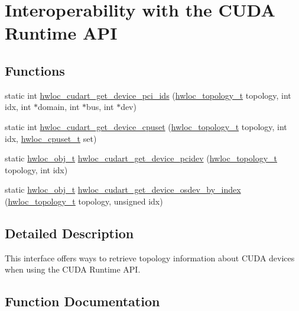 \hypertarget{a00220}{}\section{Interoperability with the C\+U\+DA Runtime A\+PI}
\label{a00220}
\subsection*{Functions}
\begin{DoxyCompactItemize}
\item 
static int \hyperlink{a00220_gad8b701d9a34923e34bd58defd4c1e704}{hwloc\+\_\+cudart\+\_\+get\+\_\+device\+\_\+pci\+\_\+ids} (\hyperlink{a00186_ga9d1e76ee15a7dee158b786c30b6a6e38}{hwloc\+\_\+topology\+\_\+t} topology, int idx, int $\ast$domain, int $\ast$bus, int $\ast$dev)
\item 
static int \hyperlink{a00220_ga187ca00c6e12800a25151ce331620980}{hwloc\+\_\+cudart\+\_\+get\+\_\+device\+\_\+cpuset} (\hyperlink{a00186_ga9d1e76ee15a7dee158b786c30b6a6e38}{hwloc\+\_\+topology\+\_\+t} topology, int idx, \hyperlink{a00183_ga4bbf39b68b6f568fb92739e7c0ea7801}{hwloc\+\_\+cpuset\+\_\+t} set)
\item 
static \hyperlink{a00185_ga79b8ab56877ef99ac59b833203391c7d}{hwloc\+\_\+obj\+\_\+t} \hyperlink{a00220_gaeda4e6efbb36b518b2c286434ad23bb2}{hwloc\+\_\+cudart\+\_\+get\+\_\+device\+\_\+pcidev} (\hyperlink{a00186_ga9d1e76ee15a7dee158b786c30b6a6e38}{hwloc\+\_\+topology\+\_\+t} topology, int idx)
\item 
static \hyperlink{a00185_ga79b8ab56877ef99ac59b833203391c7d}{hwloc\+\_\+obj\+\_\+t} \hyperlink{a00220_gac0f3eeaf7712919f298097b1a21307b0}{hwloc\+\_\+cudart\+\_\+get\+\_\+device\+\_\+osdev\+\_\+by\+\_\+index} (\hyperlink{a00186_ga9d1e76ee15a7dee158b786c30b6a6e38}{hwloc\+\_\+topology\+\_\+t} topology, unsigned idx)
\end{DoxyCompactItemize}


\subsection{Detailed Description}
This interface offers ways to retrieve topology information about C\+U\+DA devices when using the C\+U\+DA Runtime A\+PI. 

\subsection{Function Documentation}
\mbox{\label{a00220_ga187ca00c6e12800a25151ce331620980}} 
